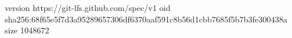 version https://git-lfs.github.com/spec/v1
oid sha256:68f65e5f7d3a95289657306df6370aaf591c8b56d1cbb7685f5b7b3fe300438a
size 1048672
